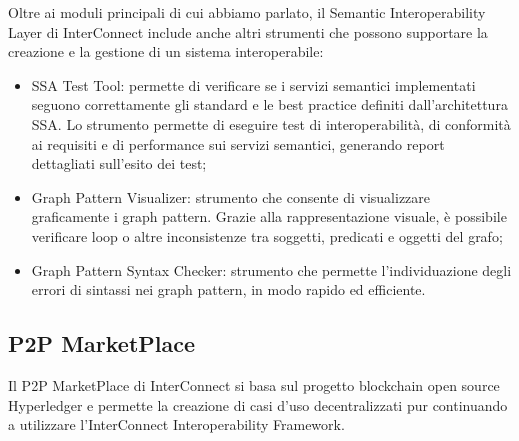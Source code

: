 Oltre ai moduli principali di cui abbiamo parlato, il Semantic Interoperability Layer di InterConnect include anche altri strumenti che possono supportare la creazione e la gestione di un sistema interoperabile:
\begin{itemize}
    \item SSA Test Tool: permette di verificare se i servizi semantici implementati seguono correttamente gli standard e le best practice definiti dall'architettura SSA. Lo strumento permette di eseguire test di interoperabilità, di conformità ai requisiti e di performance sui servizi semantici, generando report dettagliati sull'esito dei test;
    \item Graph Pattern Visualizer: strumento che consente di visualizzare graficamente i graph pattern. Grazie alla rappresentazione visuale, è possibile verificare loop o altre inconsistenze tra soggetti, predicati e oggetti del grafo;
    \item Graph Pattern Syntax Checker: strumento che permette l'individuazione degli errori di sintassi nei graph pattern, in modo rapido ed efficiente.
\end{itemize}



\subsection{P2P MarketPlace}
Il P2P MarketPlace di InterConnect si basa sul progetto blockchain open source Hyperledger e permette la creazione di casi d'uso decentralizzati pur continuando a utilizzare l'InterConnect Interoperability Framework.
